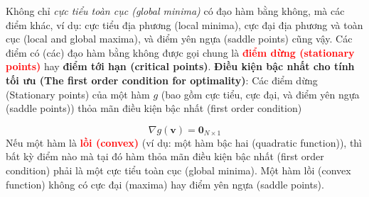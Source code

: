 \documentclass{book}
\begin{document}
Không chỉ \textit{cực tiểu toàn cục (global minima)} có đạo hàm bằng không, mà các điểm khác, ví dụ: cực tiểu địa phương (local minima), cực đại địa phương và toàn cục (local and global maxima), và điểm yên ngựa (saddle points) cũng vậy.
Các điểm có (các) đạo hàm bằng không được gọi chung là \textbf{\textcolor{red}{điểm dừng (stationary points)}} hay \textbf{điểm tới hạn (critical points)}.
\textbf{Điều kiện bậc nhất cho tính tối ưu (The first order condition for optimality)}: Các điểm dừng (Stationary points) của một hàm $g$ (bao gồm cực tiểu, cực đại, và điểm yên ngựa (saddle points)) thỏa mãn điều kiện bậc nhất (first order condition)
    
\begin{equation*}
    \nabla g\left(\mathbf{v}\right)=\mathbf{0}_{N\times1}
\end{equation*}
Nếu một hàm là \textbf{\textcolor{red}{lồi (convex)}} (ví dụ: một hàm bậc hai (quadratic function)), thì bất kỳ điểm nào mà tại đó hàm thỏa mãn điều kiện bậc nhất (first order condition) phải là một cực tiểu toàn cục (global minima). Một hàm lồi (convex function) không có cực đại (maxima) hay điểm yên ngựa (saddle points).
\end{document}
